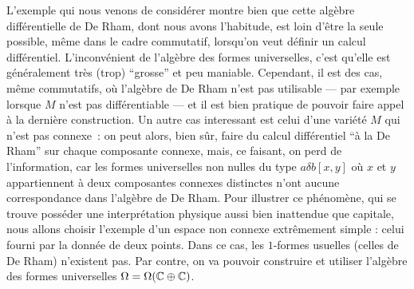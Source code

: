 	L'exemple qui nous venons de consid\'erer montre bien que cette alg\`ebre 
	diff\'erentielle de De Rham, dont nous avons l'habitude, est loin 
	d'\^etre la seule possible, m\^eme dans le cadre commutatif, lorsqu'on 
	veut d\'efinir un calcul diff\'erentiel. L'inconv\'enient de l'alg\`ebre des 
	formes universelles, c'est qu'elle est g\'en\'eralement tr\`es (trop) 
	``grosse''  et peu maniable.
	Cependant, il est des cas, m\^eme commutatifs, o\`u 
	l'alg\`ebre de De Rham n'est pas utilisable --- par exemple lorsque $M$ 
	n'est pas diff\'erentiable --- et il est bien pratique de pouvoir faire 
	appel \`a la derni\`ere construction. Un autre cas interessant est celui d'une 
	vari\'et\'e $M$ qui n'est pas connexe~: on peut alors, bien s\^ur, faire du 
	calcul diff\'erentiel ``\`a la De Rham'' sur chaque composante connexe, 
	mais, ce faisant, on perd de l'information, car les formes 
	universelles non nulles du type $a \delta b [x,y]$ o\`u $x$ et $y$ 
	appartiennent \`a deux composantes connexes distinctes n'ont aucune 
	correspondance dans l'alg\`ebre de De Rham. Pour illustrer ce 
	ph\'enom\`ene, qui se trouve poss\'eder une interpr\'etation physique aussi bien 
	inattendue que capitale, nous allons choisir l'exemple d'un espace 
	non connexe extr\^emement simple : celui fourni par la donn\'ee de deux 
	points. Dans ce cas, les $1$-formes usuelles (celles de De Rham) 
	n'existent pas. Par contre, on va pouvoir construire et utiliser 
	l'alg\`ebre des formes universelles $\Omega  =  \Omega(\mathbb{C} \oplus 
	\mathbb{C})$.
	
